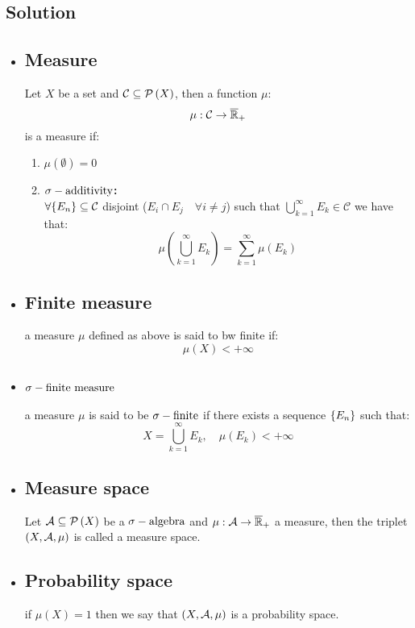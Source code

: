 \subsection*{Solution}
\provdefs
\begin{itemize}
    \item \subsection{Measure} Let $X$ be a set and $\mathcal{C}\subseteq\mathcal{P}\left(X\right)$, then a function $\mu$:
    \[
        \mu:\mathcal{C}\to\overline{\mathbb{R}}_{+}    
    \]
    is a measure if:
    \begin{enumerate}
        \item $\mu(\emptyset)=0$
        \item \textbf{$\sigma-\text{additivity}$:}\\
        $\forall \{ E_n \}\subseteq\mathcal{C}$ disjoint ($E_i\cap E_j\quad \forall i\neq j$) such that $\bigcup_{k=1}^{\infty} E_k \in \mathcal{C}$ we have that:
        \[
            \mu \left( \bigcup_{k=1}^{\infty} E_k \right) = \sum_{k=1}^{\infty} \mu(E_k) 
        \]
    \end{enumerate}
    \item \subsection{Finite measure} a measure $\mu$ defined as above is said to bw finite if:
    \[
        \mu(X) < + \infty    
    \]
    \item \subsection{\texorpdfstring{$\sigma-\text{finite measure}$}{TEXT}} a measure $\mu$ is said to be $\sigma-\text{finite}$ if there exists a sequence $\{ E_n \}$ such that:
    \[
        X = \bigcup_{k=1}^\infty E_k, \quad \mu(E_k) <+\infty
    \]
    \item \subsection{Measure space} Let $\mathcal{A}\subseteq\mathcal{P}\left(X\right)$ be a $\sigma-\text{algebra}$ and $\mu:\mathcal{A}\to\overline{\mathbb{R}}_{+}$ a measure, then the triplet $(X,\mathcal{A},\mu)$ is called  a measure space.
    \item \subsection{Probability space} if $\mu(X)=1$ then we say that $(X,\mathcal{A},\mu)$ is a probability space.
\end{itemize}

